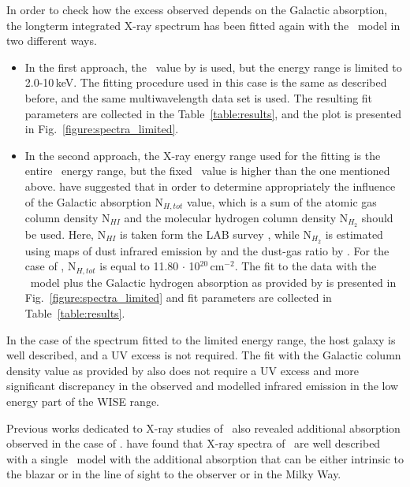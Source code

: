 In order to check how the excess observed depends on the Galactic absorption, the longterm integrated X-ray spectrum has been fitted again with the \po\ model in two different ways. 
\begin{itemize}
 \item In the first approach, the \nh\ value by \cite{Kalberla2005} is used, but the energy range is limited to 2.0-10\,keV. 
The fitting procedure used in this case is the same as described before, and the same multiwavelength data set is used. 
The resulting fit parameters are collected in the Table~\ref{table:results}, and the plot is presented in Fig.~\ref{figure:spectra_limited}.

\item 
In the second approach, the X-ray energy range used for the fitting is the entire \xrt\ energy range, but the fixed \nh\ value is higher than the one mentioned above.
 \cite{Willingale13} have suggested that in order to determine appropriately the influence of the Galactic absorption N$_{H,tot}$ value, which is a sum of the atomic gas column density N$_{HI}$ and the molecular hydrogen column density N$_{H_2}$ should be used.
Here, N$_{HI}$ is taken form the LAB survey \citep{Kalberla2005}, while N$_{H_2}$ is estimated using maps of dust infrared emission by \cite{Schlegel98} and the dust-gas ratio by \cite{Dame01}.
For the case of \one, N$_{H,tot}$  is equal to 11.80 $\cdot$ 10$^{20}$\,cm$^{-2}$. 
The fit to the data with the \po\ model plus the Galactic hydrogen absorption as provided by \cite{Willingale13} is presented in Fig.~\ref{figure:spectra_limited}
and fit parameters are collected in Table~\ref{table:results}.
\end{itemize}



In the case of the spectrum fitted to the limited energy range, the host galaxy is well described, and a UV excess is not required. 
The fit with the Galactic column density  value as provided by \cite{Willingale13} also does not require a UV excess and more significant discrepancy in the observed and modelled infrared emission in the low energy part of the WISE range. 

Previous works dedicated to X-ray studies of \one\ also revealed additional absorption observed in the case of \one. 
\cite{Kaufmann2011} have found that X-ray spectra of \one\ are well described with a single \po\ model with the additional absorption that can be either intrinsic to the blazar or in the line of sight to the observer or in the Milky Way. 
 
